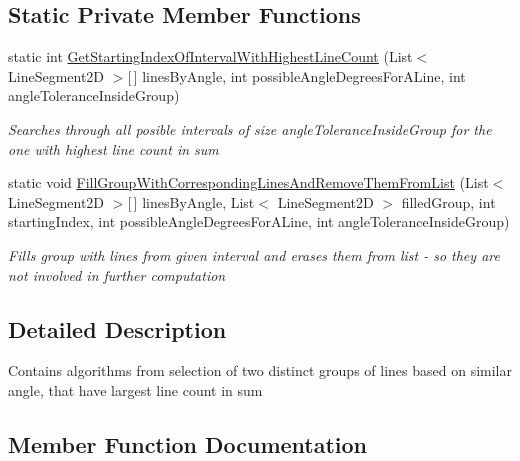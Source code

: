 \subsection*{Static Private Member Functions}
\begin{DoxyCompactItemize}
\item 
static int \mbox{\hyperlink{class_chess_tracking_1_1_image_processing_1_1_chessboard_algorithms_1_1_lines_into_groups_a32efa1b87e4bac9c7f78f5a1f2a005fd}{Get\+Starting\+Index\+Of\+Interval\+With\+Highest\+Line\+Count}} (List$<$ Line\+Segment2D $>$\mbox{[}$\,$\mbox{]} lines\+By\+Angle, int possible\+Angle\+Degrees\+For\+A\+Line, int angle\+Tolerance\+Inside\+Group)
\begin{DoxyCompactList}\small\item\em Searches through all posible intervals of size angle\+Tolerance\+Inside\+Group for the one with highest line count in sum \end{DoxyCompactList}\item 
static void \mbox{\hyperlink{class_chess_tracking_1_1_image_processing_1_1_chessboard_algorithms_1_1_lines_into_groups_a322e54db7985e240e14d02874b5d7a15}{Fill\+Group\+With\+Corresponding\+Lines\+And\+Remove\+Them\+From\+List}} (List$<$ Line\+Segment2D $>$\mbox{[}$\,$\mbox{]} lines\+By\+Angle, List$<$ Line\+Segment2D $>$ filled\+Group, int starting\+Index, int possible\+Angle\+Degrees\+For\+A\+Line, int angle\+Tolerance\+Inside\+Group)
\begin{DoxyCompactList}\small\item\em Fills group with lines from given interval and erases them from list -\/ so they are not involved in further computation \end{DoxyCompactList}\end{DoxyCompactItemize}


\subsection{Detailed Description}
Contains algorithms from selection of two distinct groups of lines based on similar angle, that have largest line count in sum 



\subsection{Member Function Documentation}
\mbox{\label{class_chess_tracking_1_1_image_processing_1_1_chessboard_algorithms_1_1_lines_into_groups_a322e54db7985e240e14d02874b5d7a15}} 
